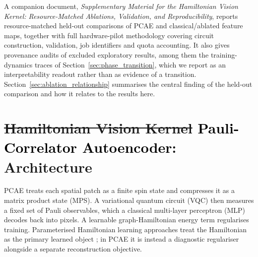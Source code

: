 \documentclass[pdflatex,sn-basic]{sn-jnl}
\newcommand{\del}[1]{\sout{#1}}
\newcommand{\add}[1]{\textbf{\textcolor{black}{#1}}}
\begin{document}
A companion document, \textit{Supplementary Material for the Hamiltonian Vision
Kernel: Resource-Matched Ablations, Validation, and Reproducibility}, reports
resource-matched held-out comparisons of PCAE and classical/ablated feature maps,
together with full hardware-pilot methodology covering circuit construction,
validation, job identifiers and quota accounting. It also gives provenance audits
of excluded exploratory results, among them the training-dynamics traces of
Section~\ref{sec:phase_transition}, which we report as an interpretability
readout rather than as evidence of a transition.
Section~\ref{sec:ablation_relationship} summarises the central finding of the
held-out comparison and how it relates to the results here.

\section[Pauli-Correlator Autoencoder: Architecture]{\del{Hamiltonian Vision Kernel} \add{Pauli-Correlator Autoencoder}: Architecture}
\label{sec:architecture}

\color{blue}
PCAE treats each spatial patch as a finite spin state and compresses it as a
matrix product state (MPS). A variational quantum circuit (VQC) then measures a
fixed set of Pauli observables, which a classical multi-layer perceptron (MLP)
decodes back into pixels. A learnable graph-Hamiltonian energy term regularises
training. Parameterised Hamiltonian learning approaches treat the Hamiltonian as
the primary learned object \citep{Shi2022}; in PCAE it is instead a diagnostic
regulariser alongside a separate reconstruction objective.
\end{document}

